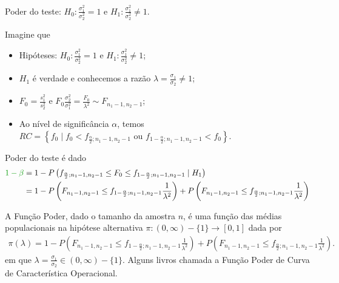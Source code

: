 \documentclass[9pt]{beamer}
\begin{document}
\begin{frame}{Poder do teste: $H_0:\frac{\sigma_1^2}{\sigma_2^2} = 1$ e $H_1:\frac{\sigma_1^2}{\sigma_2^2} \neq 1$.}

\small

Imagine que
\begin{itemize}
	\item Hipóteses: $H_0:\frac{\sigma_1^2}{\sigma_2^2} = 1$ e $H_1:\frac{\sigma_1^2}{\sigma_2^2} \neq 1$;
	\item $H_1$ é verdade e conhecemos a razão $\lambda=\frac{\sigma_1}{\sigma_2} \neq 1$;
	\item $F_0 = \frac{s_1^2}{s_2^2}$ e $F_0 \frac{\sigma_2^2}{\sigma_1^2}=  \frac{F_0}{\lambda^2} \sim F_{n_1-1, n_2-1}$;
	\item Ao nível de significância $\alpha$, temos $RC = \left\{ f_0 \mid f_0 < f_{\frac{\alpha}{2}; n_1-1, n_2-1} \mbox{ ou } f_{1-\frac{\alpha}{2}; n_1-1, n_2-1} < f_0 \right\}$.
\end{itemize}
\vfill	

Poder do teste é dado
\begin{align*}
\textcolor{important}{1-\beta} &=1 - P\left( f_{\frac{\alpha}{2}; n_1-1, n_2-1} \leq F_0  \leq f_{1-\frac{\alpha}{2}; n_1-1, n_2-1} \mid H_1\right)\\
&= 1 - P \left(F_{n_1-1, n_2-1} \leq f_{1-\frac{\alpha}{2};n_1-1, n_2-1} \frac{1}{\lambda^2} \right) + P \left(F_{n_1-1, n_2-1} \leq f_{\frac{\alpha}{2};n_1-1, n_2-1} \frac{1}{\lambda^2} \right)
\end{align*}
\vfill

A \textcolor{important}{Função Poder}, dado o tamanho da amostra $n$, é uma função das médias populacionais na hipótese alternativa  $\pi: (0,\infty) - \{1\} \longrightarrow [0,1]$ dada por
\begin{align*}
\pi(\lambda) = 1 - P \left(F_{n_1-1, n_2-1} \leq f_{1-\frac{\alpha}{2};n_1-1, n_2-1} \frac{1}{\lambda^2} \right) + P \left(F_{n_1-1, n_2-1} \leq f_{\frac{\alpha}{2};n_1-1, n_2-1} \frac{1}{\lambda^2} \right).
\end{align*}
em que $\lambda = \frac{\sigma_1}{\sigma_2} \in (0, \infty)- \{1\}$. Alguns livros chamada a Função Poder de \textcolor{important}{Curva de Característica Operacional.}

\normalsize

\end{frame}
\end{document}
